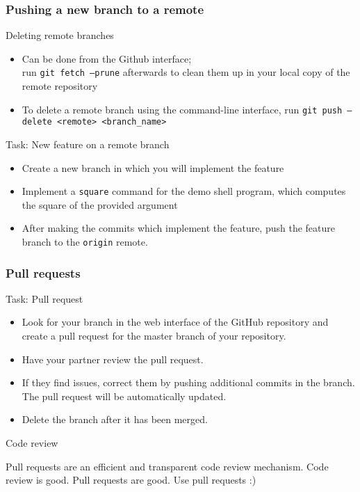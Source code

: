 
\begin{frame}[fragile]

\frametitle{Pushing a new branch to a remote}

\begin{block}{Deleting remote branches}
	\begin{itemize}
	\item Can be done from the Github interface;
	\\ run \texttt{git fetch --prune} afterwards to clean them up in your local copy of the remote repository
	\item To delete a remote branch using the command-line interface, run \texttt{git push --delete <remote> <branch\_name>}
	\end{itemize}
\end{block}	

\begin{block}{Task: New feature on a remote branch}
	\begin{itemize}
	\item Create a new branch in which you will implement the feature
	\item Implement a \texttt{square} command for the demo shell program, which computes the square of the provided argument
 	\item After making the commits which implement the feature, push the feature branch to the \texttt{origin} remote.
	\end{itemize}
\end{block}	
\end{frame}


\begin{frame}[fragile]
	
\frametitle{Pull requests}

\begin{block}{Task: Pull request}
	\begin{itemize}
	\item Look for your branch in the web interface of the GitHub repository and create a pull request for the master branch of your repository. 
	\item Have your partner review the pull request. 
	\item If they find issues, correct them by pushing additional commits in the branch. The pull request will be automatically updated.
	\item Delete the branch after it has been merged.
	\end{itemize}	
	
\end{block}	

\begin{block}{Code review}

Pull requests are an efficient and transparent code review mechanism. Code review is good. Pull requests are good. Use pull requests :)
\end{block}

\end{frame}

